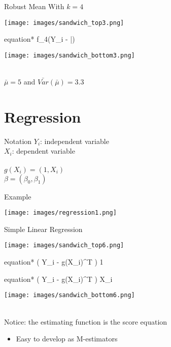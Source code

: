 \documentclass{beamer}
\begin{document}
\begin{frame}{Robust Mean}
	With $k=4$
	\begin{center}
		\texttt{[image: images/sandwich\_top3.png]}
		\begin{empheq}[box=\wbox]{equation*}
			f_4(Y_i - \bar{\mu})
		\end{empheq}
		\texttt{[image: images/sandwich\_bottom3.png]}
	\end{center}~\\
	$\bar{\mu} = 5$ and $\bar{Var}(\bar{\mu}) = 3.3$
\end{frame}

\section{Regression}

\begin{frame}{Notation}
	$Y_i$: independent variable\\
	$X_i$: dependent variable\\~\\
	$g(X_i) = (1, X_i)$\\
	$\beta = (\beta_0, \beta_1)$
\end{frame}

\begin{frame}{Example}
	\begin{center}
		\texttt{[image: images/regression1.png]}
	\end{center}
\end{frame}

\begin{frame}{Simple Linear Regression}
	\begin{center}
		\texttt{[image: images/sandwich\_top6.png]}
		\begin{empheq}[box=\wbox]{equation*}
			\left( Y_i - g(X_i)^T \hat{\beta} \right) 1
		\end{empheq}
		\begin{empheq}[box=\wbox]{equation*}
			\left( Y_i - g(X_i)^T \hat{\beta} \right) X_i
		\end{empheq}
		\texttt{[image: images/sandwich\_bottom6.png]}
	\end{center}
	~\\ Notice: the estimating function is the score equation
	\begin{itemize}
		\item Easy to develop as M-estimators
	\end{itemize}
\end{frame}
\end{document}
